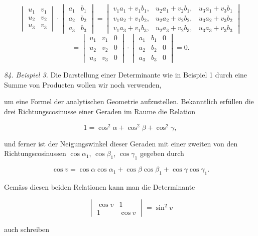 \[
\begin{vmatrix}u_1 & v_1\\ u_2 & v_2\\ u_3 & v_3\end{vmatrix}
\cdot
\begin{vmatrix}a_1 & b_1\\ a_2 & b_2\\ a_3 & b_3\end{vmatrix}
=
\begin{vmatrix}
v_1a_1+v_1b_1, & u_2a_1+v_2b_1, & u_3a_1+v_3b_1\\ %
v_1a_2+v_1b_2, & u_2a_2+v_2b_2, & u_3a_2+v_3b_2\\
v_1a_3+v_1b_3, & u_2a_3+v_2b_3, & u_3a_3+v_3b_3
\end{vmatrix}
\]
\[
=
\begin{vmatrix}u_1 & v_1 & 0\\ u_2 & v_2 & 0\\ u_3 & v_3 & 0\end{vmatrix}
\cdot
\begin{vmatrix}a_1 & b_1 & 0\\ a_2 & b_2 & 0\\ a_3 & b_3 & 0\end{vmatrix}
=0.
\]

\textit{84. Beispiel 3.} Die Darstellung einer Determinante wie in Beispiel 1 durch eine Summe von Producten wollen wir noch verwenden,



um eine Formel der analytischen Geometrie aufzustellen. Bekanntlich erfüllen die drei Richtungscosinusse einer Geraden im Raume die Relation

\[
1=\cos^2\alpha+\cos^2\beta+\cos^2\gamma,
\]

und ferner ist der Neigungswinkel dieser Geraden mit einer zweiten von den Richtungscosinussen $\cos\alpha_1$, $\cos\beta_1$, $\cos\gamma_1$ gegeben durch

\[
\cos v=\cos\alpha\cos\alpha_1+\cos\beta\cos\beta_1+\cos\gamma\cos\gamma_1.
\]

Gemäss diesen beiden Relationen kann man die Determinante

\[
\begin{vmatrix}\cos v & 1\\ 1 & \cos v\end{vmatrix}=\sin^2 v
\]

auch schreiben

